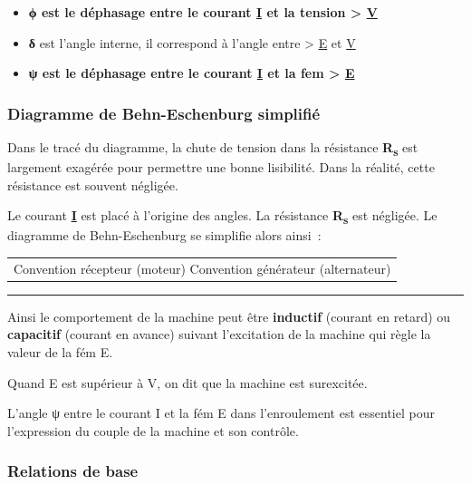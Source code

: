 \begin{itemize}
\item
  \textbf{ϕ est le déphasage entre le courant \ul{I} et la tension \textgreater{} \ul{V}}
\item
  \textbf{δ} est l'angle interne, il correspond à l'angle entre \textgreater{} \ul{E} et \ul{V}
\item
  \textbf{ψ est le déphasage entre le courant \ul{I} et la fem \textgreater{} \ul{E}}
\end{itemize}

\hypertarget{diagramme-de-behn-eschenburg-simplifiuxe9}{%
\subsubsection{Diagramme de Behn-Eschenburg simplifié}\label{diagramme-de-behn-eschenburg-simplifiuxe9}}

Dans le tracé du diagramme, la chute de tension dans la résistance \textbf{R\textsubscript{s}} est largement exagérée pour permettre une bonne lisibilité. Dans la réalité, cette résistance est souvent négligée.

Le courant \textbf{\ul{I}} est placé à l'origine des angles. La résistance \textbf{R\textsubscript{s}} est négligée. Le diagramme de Behn-Eschenburg se simplifie alors ainsi~:

\begin{longtable}[]{@{}l@{}}
\toprule\noalign{}
\endhead
\bottomrule\noalign{}
\endlastfoot
Convention récepteur (moteur) Convention générateur (alternateur) \\
\end{longtable}

\begin{center}\rule{0.5\linewidth}{0.5pt}\end{center}

Ainsi le comportement de la machine peut être \textbf{inductif} (courant en retard) ou \textbf{capacitif} (courant en avance) suivant l'excitation de la machine qui règle la valeur de la fém E.

Quand E est supérieur à V, on dit que la machine est surexcitée.

L'angle ψ entre le courant I et la fém E dans l'enroulement est essentiel pour l'expression du couple de la machine et son contrôle.

\hypertarget{relations-de-base}{%
\subsubsection{Relations de base}\label{relations-de-base}}

